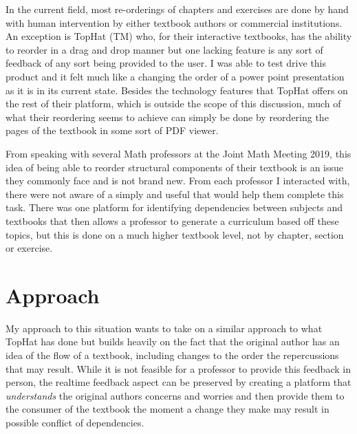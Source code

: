 In the current field, most re-orderings of chapters and exercises are done by hand with human intervention by either textbook authors or commercial institutions. An exception is TopHat (TM) who, for their interactive textbooks, has the ability to reorder in a drag and drop manner but one lacking feature is any sort of feedback of any sort being provided to the user. I was able to test drive this product and it felt much like a changing the order of a power point presentation as it is in its current state. Besides the technology features that TopHat offers on the rest of their platform, which is outside the scope of this discussion, much of what their reordering seems to achieve can simply be done by reordering the pages of the textbook in some sort of PDF viewer.

From speaking with several Math professors at the Joint Math Meeting 2019, this idea of being able to reorder structural components of their textbook is an issue they commonly face and is not brand new. From each professor I interacted with, there were not aware of a simply and useful that would help them complete this task. There was one platform for identifying dependencies between subjects and textbooks that then allows a professor to generate a curriculum based off these topics, but this is done on a much higher textbook level, not by chapter, section or exercise.

\section{Approach}

My approach to this situation wants to take on a similar approach to what TopHat has done but builds heavily on the fact that the original author has an idea of the flow of a textbook, including changes to the order the repercussions that may result. While it is not feasible for a professor to provide this feedback in person, the realtime feedback aspect can be preserved by creating a platform that \textit{understands} the original authors concerns and worries and then provide them to the consumer of the textbook the moment a change they make may result in possible conflict of dependencies.

